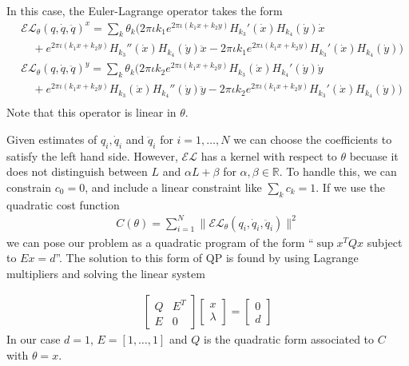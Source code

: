 \documentclass[12pt]{amsart}
\begin{document}
In this case, the Euler-Lagrange operator takes the form
\begin{align*}
	&\mathcal{EL}_\theta (q,\dot{q},\ddot{q})^x = \sum_k \theta_k ( 2\pi \iota k_1 e^{2\pi \iota (k_1 x + k_2 y)} H_{k_3}'(\dot{x}) H_{k_4}(\dot{y}) \dot{x} \\
	&\quad + e^{2\pi \iota (k_1 x + k_2 y)}H_{k_3}''(\dot{x}) H_{k_4}(\dot{y}) \ddot{x} - 2\pi \iota k_1 e^{2\pi \iota (k_1 x + k_2 y)} H_{k_3}'(\dot{x}) H_{k_4}(\dot{y}) )  \\
	&\mathcal{EL}_\theta (q,\dot{q},\ddot{q})^y = \sum_k \theta_k ( 2\pi \iota k_2 e^{2\pi \iota (k_1 x + k_2 y)} H_{k_3}(\dot{x}) H_{k_4}'(\dot{y}) \dot{y} \\
	&\quad + e^{2\pi \iota (k_1 x + k_2 y)}H_{k_3}(\dot{x}) H_{k_4}''(\dot{y}) \ddot{y} - 2\pi \iota k_2 e^{2\pi \iota (k_1 x + k_2 y)} H_{k_3}'(\dot{x}) H_{k_4}(\dot{y}) ) \\
\end{align*}
Note that this operator is linear in $\theta$.

Given estimates of $q_i, \dot{q}_i$ and $\ddot{q}_i$ for $i=1,\dots, N$ we can choose the coefficients to satisfy the left hand side.
However, $\mathcal{EL}$ has a kernel with respect to $\theta$ becuase
it does not distinguish between $L$ and $\alpha L + \beta$ for $\alpha,\beta \in \mathbb{R}$.
To handle this, we can constrain $c_0 = 0$, and include a linear constraint like $\sum_k c_k = 1$.
If we use the quadratic cost function
\begin{align*}
	C( \theta ) = \sum_{i=1}^{N} \| \mathcal{EL}_\theta( q_i ,\dot{q}_i ,\ddot{q}_i  ) \|^2
\end{align*}
we can pose our problem as a quadratic program of the form ``$\sup x^T Q x$ subject to $Ex = d$''.
The solution to this form of QP is found by using Lagrange multipliers and solving the linear system

\begin{align*}
	\begin{bmatrix}
		Q & E^T \\
		E & 0 
	\end{bmatrix}
	\begin{bmatrix}
		x \\
		\lambda
	\end{bmatrix}
	=
	\begin{bmatrix}
		0 \\
		d
	\end{bmatrix}
\end{align*}
In our case $d=1$, $E = [1,\dots,1]$ and $Q$ is the quadratic form associated to $C$ with $\theta = x$.
\end{document}
